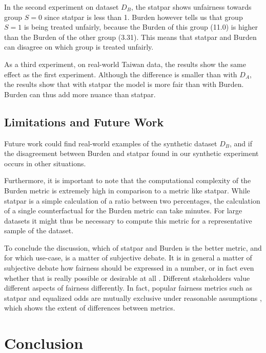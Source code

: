 \documentclass[runningheads]{llncs}
\begin{document}
In the second experiment on dataset $D_B$, the \gls{statpar} shows unfairness
towards group $S=0$ since \gls{statpar} is less than 1. Burden however tells us
that group $S=1$ is being treated unfairly, because the Burden of this group
(11.0) is higher than the Burden of the other group (3.31). This means that
\gls{statpar} and Burden can disagree on which group is treated unfairly.

As a third experiment, on real-world Taiwan data, the results show the same
effect as the first experiment. Although the difference is smaller than with
$D_A$, the results show that with \gls{statpar} the model is more fair than
with Burden. Burden can thus add more nuance than \gls{statpar}.

\subsection{Limitations and Future Work}

Future work could find real-world examples of the synthetic dataset $D_B$, and
if the disagreement between \gls{Burden} and \gls{statpar} found in our
synthetic experiment occurs in other situations.

Furthermore, it is important to note that the computational complexity of the
\gls{Burden} metric is extremely high in comparison to a metric like
\gls{statpar}. While \gls{statpar} is a simple calculation of a ratio between
two percentages, the calculation of a single counterfactual for the
\gls{Burden} metric can take minutes. For large datasets it might thus be
necessary to compute this metric for a representative sample of the dataset.

To conclude the discussion, which of \gls{statpar} and \gls{Burden} is the
better metric, and for which use-case, is a matter of subjective debate. It is
in general a matter of subjective debate how fairness should be expressed in a
number, or in fact even whether that is really possible or desirable at all
\cite{corbett2018measure}. Different stakeholders value different aspects of
fairness differently. In fact, popular fairness metrics such as \gls{statpar}
and equalized odds \cite{hardt2016equality} are mutually exclusive under
reasonable assumptions \cite{chouldechova2017fair}, which shows the extent of
differences between metrics.

\section{Conclusion}\label{sec:conclusion}
\end{document}
